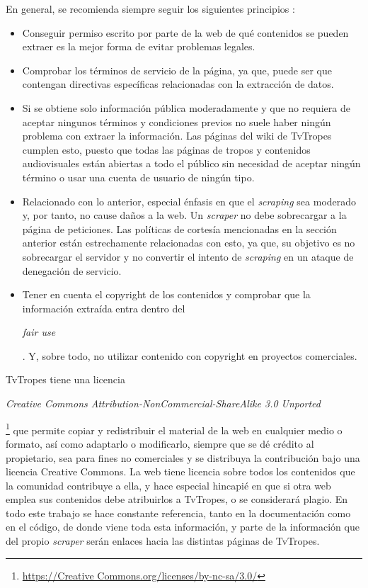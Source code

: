En general, se recomienda siempre seguir los siguientes principios
\cite{apress2018scraping}:
\begin{itemize}
    \item Conseguir permiso escrito por parte de la web de qué contenidos se
    pueden extraer es la mejor forma de evitar problemas legales.
    \item Comprobar los términos de servicio de la página, ya que, puede ser que
    contengan directivas específicas relacionadas con la extracción de datos.
    \item Si se obtiene solo información pública moderadamente y que no requiera
    de aceptar ningunos términos y condiciones previos no suele haber ningún
    problema con extraer la información. Las páginas del wiki de TvTropes
    cumplen esto, puesto que todas las páginas de tropos y contenidos
    audiovisuales están abiertas a todo el público sin necesidad de aceptar
    ningún término o usar una cuenta de usuario de ningún tipo.
    \item Relacionado con lo anterior, especial énfasis en que el
    \textit{scraping} sea moderado y, por tanto, no cause daños a la web. Un
    \textit{scraper} no debe sobrecargar a la página de peticiones. Las
    políticas de cortesía mencionadas en la sección anterior están estrechamente
    relacionadas con esto, ya que, su objetivo es no sobrecargar el servidor y
    no convertir el intento de \textit{scraping} en un ataque de denegación de
    servicio.
    \item Tener en cuenta el copyright de los contenidos y comprobar que la
    información extraída entra dentro del
    \begin{otherlanguage}{english}\textit{fair use}\end{otherlanguage}. Y, sobre
    todo, no utilizar contenido con copyright en proyectos comerciales.
\end{itemize}

TvTropes tiene una licencia \begin{otherlanguage}{english}\textit{Creative
Commons Attribution-NonCommercial-ShareAlike 3.0
Unported}\end{otherlanguage}\footnote{\url{https://Creative
Commons.org/licenses/by-nc-sa/3.0/}} que permite copiar y redistribuir el
material de la web en cualquier medio o formato, así como adaptarlo o
modificarlo, siempre que se dé crédito al propietario, sea para fines no
comerciales y se distribuya la contribución bajo una licencia Creative Commons.
La web tiene licencia sobre todos los contenidos que la comunidad contribuye a
ella, y hace especial hincapié en que si otra web emplea sus contenidos debe
atribuirlos a TvTropes, o se considerará plagio. En todo este trabajo se hace
constante referencia, tanto en la documentación como en el código, de donde
viene toda esta información, y parte de la información que del propio
\textit{scraper} serán enlaces hacia las distintas páginas de TvTropes. 

